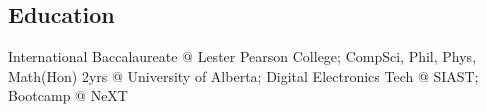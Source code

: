 \documentclass[line,margin,hidelinks]{res}
\begin{document}
\begin{resume}


\section{Education}
\begin{par}
International Baccalaureate @ Lester Pearson College; CompSci, Phil, Phys, Math(Hon) 2yrs @ University of Alberta; Digital Electronics Tech @ SIAST; Bootcamp @ NeXT
\end{par}

\end{resume}
\end{document}
